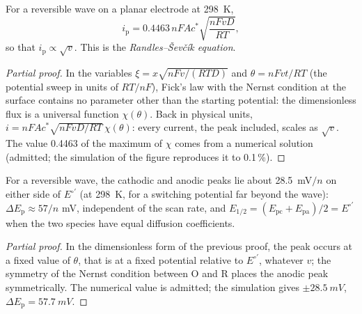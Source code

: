 \begin{proposition}\label{prop:b3:electrode-kinetics:randles-sevcik}
For a reversible wave on a planar electrode at \qty{298}{K},
\[
  i_{\mathrm p} = 0.4463\,nFAc^*\sqrt{\frac{nFvD}{RT}},
\]
so that $i_{\mathrm p} \propto \sqrt v$. This is the \emph{Randles--Ševčík equation}.
\end{proposition}

\begin{proof}[Partial proof]
In the variables $\xi = x\sqrt{nFv/(RTD)}$ and $\theta = nFvt/RT$ (the potential sweep in units of
$RT/nF$), Fick's law with the Nernst condition at the surface contains no
parameter other than the starting potential: the dimensionless flux is a
universal function $\chi(\theta)$. Back in physical units, $i = nFAc^*\sqrt{nFvD/RT}\,\chi(\theta)$: every
current, the peak included, scales as $\sqrt v$. The value 0.4463 of the maximum of
$\chi$ comes from a numerical solution (admitted; the simulation of the figure
reproduces it to 0.1\,\%).
\end{proof}

\begin{proposition}\label{prop:b3:electrode-kinetics:delta-ep}
For a reversible wave, the cathodic and anodic peaks lie about \qty{28.5}{mV}$/n$
on either side of $E^{\circ\prime}$ (at \qty{298}{K}, for a switching potential far beyond the wave):
$\Delta E_{\mathrm p} \approx 57/n$ mV, independent of the scan rate, and $E_{1/2} = (E_{\mathrm{pc}} + E_{\mathrm{pa}})/2 =
E^{\circ\prime}$ when the two species have equal diffusion coefficients.
\end{proposition}

\begin{proof}[Partial proof]
In the dimensionless form of the previous proof, the peak occurs at a fixed
value of $\theta$, that is at a fixed potential relative to $E^{\circ\prime}$, whatever $v$; the
symmetry of the Nernst condition between O and R places the anodic peak
symmetrically. The numerical value is admitted; the simulation gives
$\pm\qty{28.5}{mV}$, $\Delta E_{\mathrm p} = \qty{57.7}{mV}$.
\end{proof}

